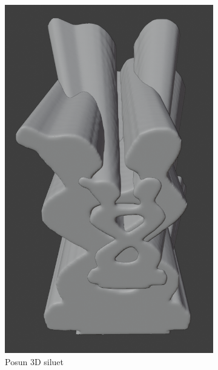 \documentclass[12pt]{report}			%
\begin{document}
\begin{figure}[h]
\begin{subfigure}[b]{0.3\textwidth}
                     \includegraphics[width=\textwidth]{images/posunuteSiluety.png}
                     \caption{Posun 3D siluet}
                     \label{delataceSiluet}
                    \end{subfigure}
                    \hfill
                    \begin{subfigure}[b]{0.3\textwidth}
                     \centering

\end{subfigure}
\end{figure}
\end{document}
